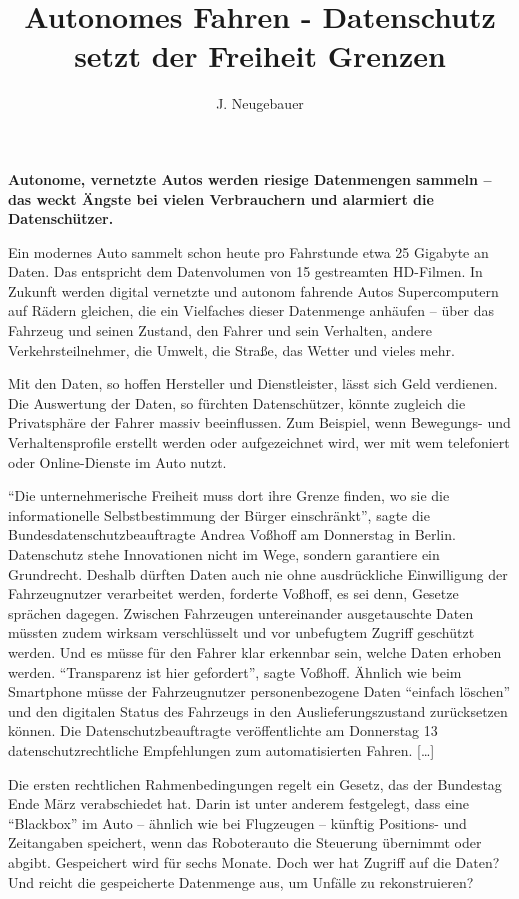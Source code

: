 \documentclass[9pt, a4paper, landscape]{scrartcl}
\author{J. Neugebauer}
\title{Autonomes Fahren - Datenschutz setzt der Freiheit Grenzen}
\date{\Heute}
\begin{document}
\begin{zeilenNrZweispaltig}
\nolinenumbers
\TITEL

\textbf{Autonome, vernetzte Autos werden riesige Datenmengen sammeln – das weckt Ängste bei vielen Verbrauchern und alarmiert die Datenschützer.}
	
\linenumbers
Ein modernes Auto sammelt schon heute pro Fahrstunde etwa 25 Gigabyte an Daten. Das entspricht dem Datenvolumen von 15 gestreamten HD-Filmen. In Zukunft werden digital vernetzte und autonom fahrende Autos Supercomputern auf Rädern gleichen, die ein Vielfaches dieser Datenmenge anhäufen – über das Fahrzeug und seinen Zustand, den Fahrer und sein Verhalten, andere Verkehrsteilnehmer, die Umwelt, die Straße, das Wetter und vieles mehr.

Mit den Daten, so hoffen Hersteller und Dienstleister, lässt sich Geld verdienen. Die Auswertung der Daten, so fürchten Datenschützer, könnte zugleich die Privatsphäre der Fahrer massiv beeinflussen. Zum Beispiel, wenn Bewegungs- und Verhaltensprofile erstellt werden oder aufgezeichnet wird, wer mit wem telefoniert oder Online-Dienste im Auto nutzt.

\enquote{Die unternehmerische Freiheit muss dort ihre Grenze finden, wo sie die informationelle Selbstbestimmung der Bürger einschränkt}, sagte die Bundesdatenschutzbeauftragte Andrea Voßhoff am Donnerstag in Berlin. Datenschutz stehe Innovationen nicht im Wege, sondern garantiere ein Grundrecht. Deshalb dürften Daten auch nie ohne ausdrückliche Einwilligung der Fahrzeugnutzer verarbeitet werden, forderte Voßhoff, es sei denn, Gesetze sprächen dagegen. Zwischen Fahrzeugen untereinander ausgetauschte Daten müssten zudem wirksam verschlüsselt und vor unbefugtem Zugriff geschützt werden. Und es müsse für den Fahrer klar erkennbar sein, welche Daten erhoben werden. \enquote{Transparenz ist hier gefordert}, sagte Voßhoff. Ähnlich wie beim Smartphone müsse der Fahrzeugnutzer personenbezogene Daten \enquote{einfach löschen} und den digitalen Status des Fahrzeugs in den Auslieferungszustand zurücksetzen können. Die Datenschutzbeauftragte veröffentlichte am Donnerstag 13 datenschutzrechtliche Empfehlungen zum automatisierten Fahren. [\dots]

Die ersten rechtlichen Rahmenbedingungen regelt ein Gesetz, das der Bundestag Ende März verabschiedet hat. Darin ist unter anderem festgelegt, dass eine \enquote{Blackbox} im Auto – ähnlich wie bei Flugzeugen – künftig Positions- und Zeitangaben speichert, wenn das Roboterauto die Steuerung übernimmt oder abgibt. Gespeichert wird für sechs Monate. Doch wer hat Zugriff auf die Daten? Und reicht die gespeicherte Datenmenge aus, um Unfälle zu rekonstruieren?


\end{zeilenNrZweispaltig}
\end{document}
